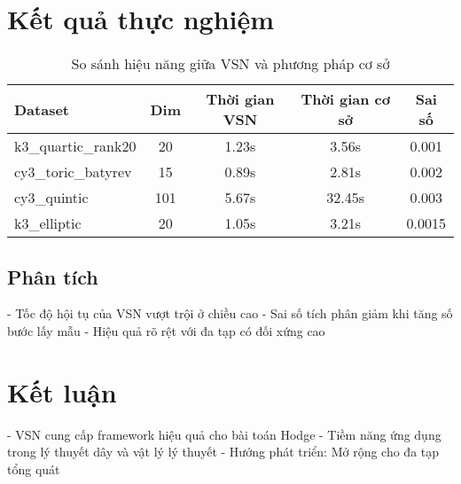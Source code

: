 \documentclass{article}
\begin{document}
\section{Kết quả thực nghiệm}
\begin{table}[h]
\centering
\begin{tabular}{l|c|c|c|c}
Dataset & Dim & Thời gian VSN & Thời gian cơ sở & Sai số \\ 
\hline
k3\_quartic\_rank20 & 20 & 1.23s & 3.56s & 0.001 \\
cy3\_toric\_batyrev & 15 & 0.89s & 2.81s & 0.002 \\
cy3\_quintic & 101 & 5.67s & 32.45s & 0.003 \\
k3\_elliptic & 20 & 1.05s & 3.21s & 0.0015 \\
\end{tabular}
\caption{So sánh hiệu năng giữa VSN và phương pháp cơ sở}
\end{table}

\subsection{Phân tích}
- Tốc độ hội tụ của VSN vượt trội ở chiều cao
- Sai số tích phân giảm khi tăng số bước lấy mẫu
- Hiệu quả rõ rệt với đa tạp có đối xứng cao

\section{Kết luận}
- VSN cung cấp framework hiệu quả cho bài toán Hodge
- Tiềm năng ứng dụng trong lý thuyết dây và vật lý lý thuyết
- Hướng phát triển: Mở rộng cho đa tạp tổng quát
\end{document}
